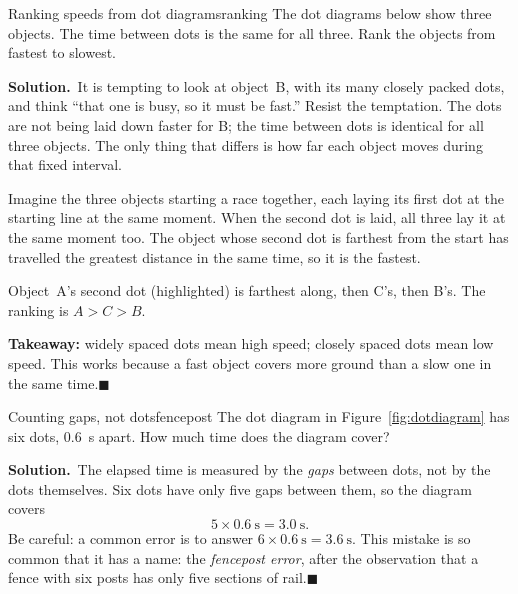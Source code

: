 \documentclass[11pt,twoside,openany]{book}
\newcommand{\solution}{\par\smallskip\noindent\textbf{Solution.}\ }
\newcommand{\qed}{\hfill$\blacksquare$}
\newcommand{\dotrow}[4]{%
  \node[anchor=east] at (-0.3,#4) {#1};
  \foreach \i in {0,...,\numexpr#3-1\relax}{\fill (\i*#2,#4) circle (2.2pt);}}
\begin{document}
\begin{example}{Ranking speeds from dot diagrams}{ranking}
The dot diagrams below show three objects. The time between dots is the same for all three. Rank the objects from fastest to slowest.

\begin{center}
\end{center}

\solution It is tempting to look at object~B, with its many closely packed dots, and think ``that one is busy, so it must be fast.'' Resist the temptation. The dots are not being laid down faster for B; the time between dots is identical for all three objects. The only thing that differs is how far each object moves during that fixed interval.

Imagine the three objects starting a race together, each laying its first dot at the starting line at the same moment. When the second dot is laid, all three lay it at the same moment too. The object whose second dot is farthest from the start has travelled the greatest distance in the same time, so it is the fastest.

\begin{center}
\end{center}

Object~A's second dot (highlighted) is farthest along, then C's, then B's. The ranking is $A > C > B$.

\textbf{Takeaway:} widely spaced dots mean high speed; closely spaced dots mean low speed. This works because a fast object covers more ground than a slow one in the same time.\qed
\end{example}

\begin{example}{Counting gaps, not dots}{fencepost}
The dot diagram in Figure~\ref{fig:dotdiagram} has six dots, \SI{0.6}{\second} apart. How much time does the diagram cover?

\solution The elapsed time is measured by the \emph{gaps} between dots, not by the dots themselves. Six dots have only five gaps between them, so the diagram covers
\[
5 \times \SI{0.6}{\second} = \SI{3.0}{\second}.
\]
Be careful: a common error is to answer $6\times\SI{0.6}{\second}=\SI{3.6}{\second}$. This mistake is so common that it has a name: the \emph{fencepost error}, after the observation that a fence with six posts has only five sections of rail.\qed
\end{example}
\end{document}
